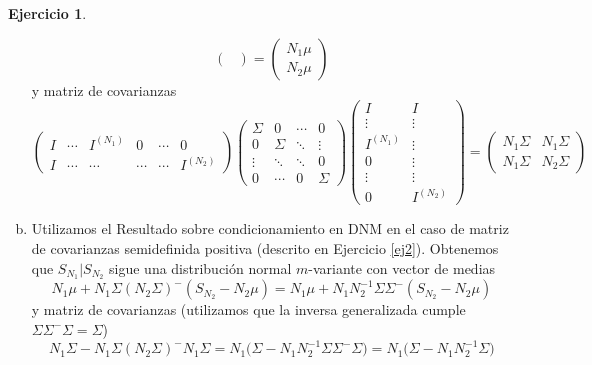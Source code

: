 \documentclass[12pt,spanish]{article}
\theoremstyle{definition}
\newtheorem{exercise}{Ejercicio}
\begin{document}
\begin{exercise}
\begin{enumerate}[a)]
\[\begin{pmatrix}
    \end{pmatrix}=
    \begin{pmatrix}
      N_1\mu \\ N_2\mu
    \end{pmatrix}\]
  y matriz de covarianzas
  \[\begin{pmatrix}
      I & \cdots & I^{(N_1)} & 0 & \cdots & 0 \\
      I & \cdots & \cdots & \cdots & \cdots & I^{(N_2)}
    \end{pmatrix}\begin{pmatrix}
      \Sigma & 0 & \cdots & 0 \\
      0 & \Sigma & \ddots & \vdots \\
      \vdots & \ddots & \ddots & 0\\
      0 & \cdots & 0 & \Sigma
    \end{pmatrix}\begin{pmatrix}
      I & I \\ \vdots & \vdots \\ I^{(N_1)} & \vdots \\ 0 & \vdots \\ \vdots & \vdots \\ 0 &I^{(N_2)}
    \end{pmatrix}=
    \begin{pmatrix}
      N_1\Sigma & N_1\Sigma \\ N_1\Sigma & N_2\Sigma
    \end{pmatrix}\]
\item Utilizamos el Resultado sobre condicionamiento en DNM en el caso
  de matriz de covarianzas semidefinida positiva (descrito en
  Ejercicio \ref{ej2}). Obtenemos que $S_{N_1}|S_{N_2}$ sigue una
  distribución normal $m$-variante con vector de medias
  \[N_1\mu+N_1\Sigma(N_2\Sigma)^-(S_{N_2}-N_2\mu)=N_1\mu+N_1N_2^{-1}\Sigma\Sigma^-(S_{N_2}-N_2\mu)\]
  y matriz de covarianzas (utilizamos que la inversa generalizada
  cumple $\Sigma\Sigma^-\Sigma=\Sigma$)
  \[N_1\Sigma-N_1\Sigma(N_2\Sigma)^-N_1\Sigma=N_1\Big(\Sigma-N_1N_2^{-1}\Sigma\Sigma^-\Sigma\Big)=N_1\Big(\Sigma-N_1N_2^{-1}\Sigma\Big)\]
  \end{enumerate}
\end{exercise}
\end{document}
